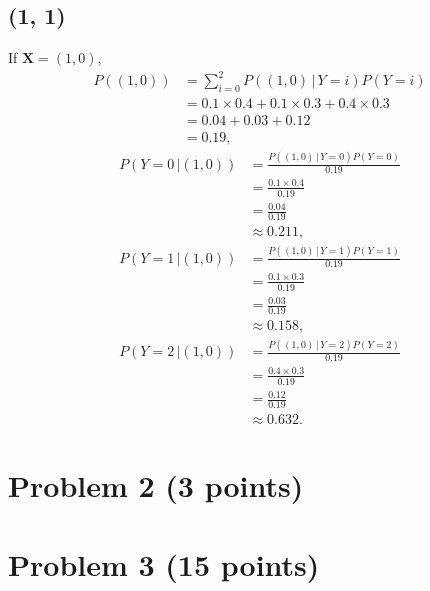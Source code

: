 \documentclass[10pt]{article}
\begin{document}
\subsection*{(1, 1)}
If $\textbf{X} = (1, 0)$, 
\begin{align*}
P((1, 0)) &= \sum_{i = 0}^2 P((1, 0) \, | \, Y = i)P(Y = i) \\
             &= 0.1 \times 0.4 + 0.1 \times 0.3 + 0.4 \times 0.3 \\
             &= 0.04 + 0.03 + 0.12 \\
             &= 0.19,
\end{align*}
\begin{align*}
P(Y = 0 \, | (1,0)) &= \frac{P((1, 0) \, | \, Y = 0)P(Y = 0)}{ 0.19 } \\
                           &= \frac{0.1 \times 0.4}{ 0.19 } \\
                           &= \frac{ 0.04 }{ 0.19 } \\
                           &\approx 0.211,
\end{align*}
\begin{align*}
P(Y = 1 \, | (1,0)) &= \frac{ P((1, 0) \, | \, Y = 1)P(Y = 1) }{ 0.19 } \\
                           &= \frac{ 0.1 \times 0.3 }{ 0.19 } \\
                           &= \frac{ 0.03 }{ 0.19 } \\
                           &\approx 0.158,
\end{align*}
\begin{align*}
P(Y = 2 \, | (1,0)) &= \frac{P((1, 0) \, | \, Y = 2)P(Y = 2)}{ 0.19 } \\
                           &= \frac{ 0.4 \times 0.3 }{ 0.19 } \\
                           &= \frac{ 0.12 }{ 0.19 } \\
                           &\approx 0.632.
\end{align*}
\section*{Problem 2 (3 points)}

\section*{Problem 3 (15 points)}
\end{document}
